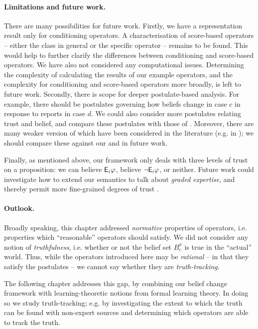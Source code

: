 \paragraph{Limitations and future work.}
There are many possibilities for future work.
%
Firstly, we have a representation result only for conditioning operators. A
characterisation of score-based operators -- either the class in general or the
specific operator \scorebasedop{} -- remains to be found. This would help to
further clarify the differences between conditioning and score-based operators.
%
We have also not considered any computational issues. Determining the
complexity of calculating the results of our example operators, and the
complexity for conditioning and score-based operators more broadly, is left to
future work.
%
Secondly, there is scope for deeper postulate-based analysis. For example,
there should be postulates governing how beliefs change in case $c$ in response
to reports in case $d$. We could also consider more postulates relating trust
and belief, and compare these postulates with those of \textcite{yasser_21}.
Moreover, there are many weaker version of  which have
been considered in the literature (e.g. in
\cite{ferme1999selective,hansson_2001,booth_trust_2018}); we should compare
these against our \condsucc{} and \strongcondsucc{} in future work.

Finally, as mentioned above, our framework only deals with three levels of
trust on a proposition: we can believe $\mathsf{E}_i\varphi$, believe $\neg \mathsf{E}_i\varphi$, or
neither. Future work could investigate how to extend our semantics to talk
about \emph{graded expertise}, and thereby permit more fine-grained
degrees of trust \cite{hunter_building_21,yasser_21,delgrande2006iterated}.

\paragraph{Outlook.}

Broadly speaking, this chapter addressed \emph{normative} properties of
operators, i.e. properties which ``reasonable'' operators should satisfy. We
did not consider any notion of \emph{truthfulness}, i.e. whether or not the
belief set $B^\sigma_c$ is true in the ``actual'' world. Thus, while the
operators introduced here may be \emph{rational} -- in that they satisfy the
postulates -- we cannot say whether they are \emph{truth-tracking}.

The following chapter addresses this gap, by combining our belief change
framework with learning-theoretic notions from formal learning theory. In doing
so we study truth-tracking; e.g. by investigating the extent to which the truth
can be found with non-expert sources and determining which operators are able
to track the truth.
